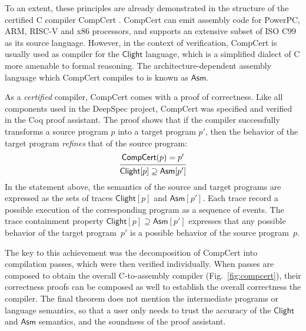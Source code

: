 \documentclass[11pt,oneside,draft]{book}
\theoremstyle{definition}
\newcommand{\kw}[1]{\ensuremath{ \mathsf{#1} }}
\begin{document}
To an extent,
these principles are already demonstrated in the structure of the
certified C compiler CompCert \citep{compcert}.
CompCert can emit assembly code
for PowerPC, ARM, RISC-V and x86 processors,
and supports an extensive subset of ISO C99
as its source language.
However,
in the context of verification,
CompCert is usually used as compiler for
the \kw{Clight} language,
which is a simplified dialect of C
more amenable to formal reasoning.
The architecture-dependent assembly language
which CompCert compiles to is known as \kw{Asm}.

As a \emph{certified} compiler,
CompCert comes with a proof of correctness.
Like all components used in the DeepSpec project,
CompCert was specified and verified
in the Coq proof assistant.
The proof shows that if the compiler successfully transforms
a source program $p$ into a target program $p'$,
then the behavior of the target program
\emph{refines} that of the source program:
\[
  \begin{prooftree}
    \hypo{\kw{CompCert}(p) = p'}
    \infer1{\kw{Clight}[p] \supseteq \kw{Asm}[p']}
  \end{prooftree}
\]
In the statement above,
the semantics of the source and target programs
are expressed as the sets of traces
$\kw{Clight}[p]$ and $\kw{Asm}[p']$.
Each trace record a possible execution of the corresponding program
as a sequence of events.
The trace containment property
$\kw{Clight}[p] \supseteq \kw{Asm}[p']$
expresses that any possible behavior of
the target program~$p'$
is a possible behavior of the source program~$p$.

The key to this achievement
was the decomposition of CompCert
into compilation passes,
which were then verified individually.
When passes are composed to obtain the overall
C-to-assembly compiler
(Fig.~\ref{fig:compcert}),
their correctness proofs can be composed as well
to establish the overall correctness the compiler.
The final theorem does not mention the intermediate
programs or language semantics,
so that a user only needs to trust
the accuracy of the \kw{Clight} and \kw{Asm} semantics,
and the soundness of the proof assistant.
\end{document}
